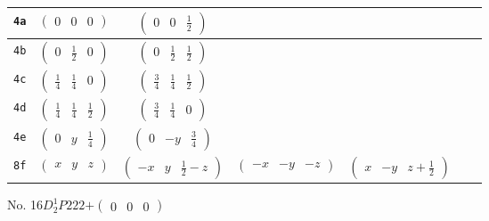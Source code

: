 \documentclass[fleqn,9pt,landscape]{jsarticle}
\begin{document}
\begin{center}
\begin{longtable}{ccccccc}
{\tt 4a} & $ \begin{pmatrix} 0 & 0 & 0 \end{pmatrix} $ & $ \begin{pmatrix} 0 & 0 & \frac{1}{2} \end{pmatrix} $ & $  $ & $  $ \\ \hline
{\tt 4b} & $ \begin{pmatrix} 0 & \frac{1}{2} & 0 \end{pmatrix} $ & $ \begin{pmatrix} 0 & \frac{1}{2} & \frac{1}{2} \end{pmatrix} $ & $  $ & $  $ \\ \hline
{\tt 4c} & $ \begin{pmatrix} \frac{1}{4} & \frac{1}{4} & 0 \end{pmatrix} $ & $ \begin{pmatrix} \frac{3}{4} & \frac{1}{4} & \frac{1}{2} \end{pmatrix} $ & $  $ & $  $ \\ \hline
{\tt 4d} & $ \begin{pmatrix} \frac{1}{4} & \frac{1}{4} & \frac{1}{2} \end{pmatrix} $ & $ \begin{pmatrix} \frac{3}{4} & \frac{1}{4} & 0 \end{pmatrix} $ & $  $ & $  $ \\ \hline
{\tt 4e} & $ \begin{pmatrix} 0 & y & \frac{1}{4} \end{pmatrix} $ & $ \begin{pmatrix} 0 & - y & \frac{3}{4} \end{pmatrix} $ & $  $ & $  $ \\ \hline
{\tt 8f} & $ \begin{pmatrix} x & y & z \end{pmatrix} $ & $ \begin{pmatrix} - x & y & \frac{1}{2} - z \end{pmatrix} $ & $ \begin{pmatrix} - x & - y & - z \end{pmatrix} $ & $ \begin{pmatrix} x & - y & z + \frac{1}{2} \end{pmatrix} $ \\
\end{longtable}
\end{center}
\newpage
No. 16\quad$D_{2}^{1}$\quad$P222$\quad[ orthorhombic ]\quad$+\begin{pmatrix} 0 & 0 & 0 \end{pmatrix}$
\end{document}
